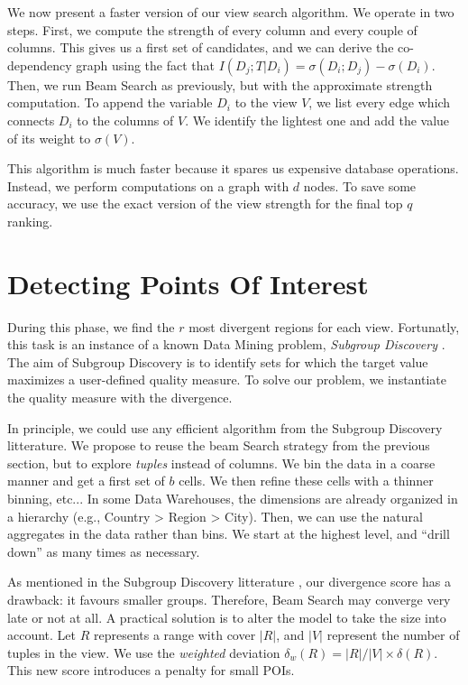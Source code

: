We now present a faster version of our view search algorithm.  We operate in
two steps. First, we compute the strength of every column and every couple of
columns.  This gives us a first set of candidates, and we can derive the
co-dependency graph using the fact that $I(D_{j} ; T | D_i) = \sigma(D_i ;
D_{j}) - \sigma(D_i)$.  Then, we run Beam Search as previously, but with the
approximate strength computation.  To append the variable $D_i$ to the view
$V$, we list every edge which connects  $D_i$ to the columns of $V$. We
identify the lightest one and add the value of its weight to $\sigma(V)$.  

This algorithm is much faster because it spares us expensive database
operations. Instead, we perform computations on a graph with $d$ nodes.  To
save some accuracy, we use the exact version of the view strength for the final
top $q$ ranking.

\section{Detecting Points Of Interest}
\label{sec:detec}

During this phase, we find the $r$ most divergent regions for each view.
Fortunatly, this task is an instance of a known Data Mining problem,
\emph{Subgroup Discovery} \cite{klosgen1996explora}\cite{wrobel1997algorithm}.
The aim of Subgroup Discovery is to identify sets for which the target value
maximizes a user-defined quality measure. To solve our problem, we instantiate
the quality measure with the divergence.

In principle, we could use any efficient algorithm from the Subgroup Discovery
litterature.  We propose to reuse the beam Search strategy from the previous
section, but to explore \emph{tuples} instead of columns. We bin the data in a
coarse manner and get a first set of $b$ cells. We then refine these cells with
a thinner binning, etc...  In some Data Warehouses, the dimensions are already
organized in a hierarchy (e.g., Country > Region > City). Then, we can use the
natural aggregates in the data rather than bins. We start at the highest level,
and ``drill down'' as many times as necessary.

As mentioned in the Subgroup Discovery litterature \cite{van2011non}, our
divergence score has a drawback: it favours smaller groups.  Therefore, Beam
Search may converge very late or not at all.  A practical
solution is to alter the model to take the size into account. Let $R$
represents a range with cover $|R|$, and $|V|$ represent the number of tuples
in the view. We use the \emph{weighted} deviation $\delta_w(R) = |R|/|V| \times
\delta(R)$. This new score introduces a penalty for small POIs.


